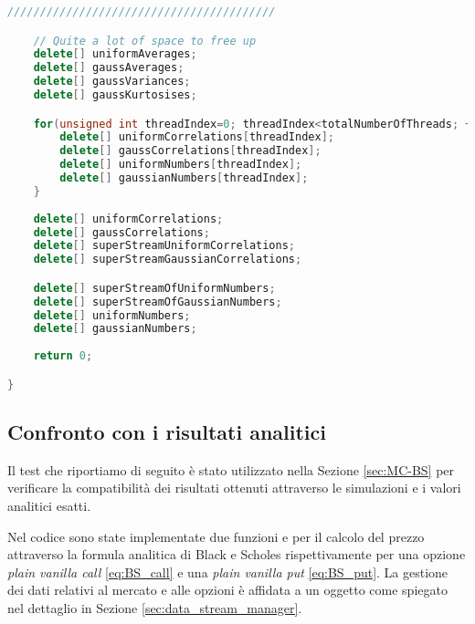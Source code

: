 \begin{lstlisting}[language=C++, caption={\texttt{libraries/CoreLibraries/RandomGenerator/CorrelationTest.cu}}]
/////////////////////////////////////////

	// Quite a lot of space to free up
	delete[] uniformAverages;
	delete[] gaussAverages;
	delete[] gaussVariances;
	delete[] gaussKurtosises;

	for(unsigned int threadIndex=0; threadIndex<totalNumberOfThreads; ++threadIndex){
		delete[] uniformCorrelations[threadIndex];
		delete[] gaussCorrelations[threadIndex];
		delete[] uniformNumbers[threadIndex];
		delete[] gaussianNumbers[threadIndex];
	}
	
	delete[] uniformCorrelations;
	delete[] gaussCorrelations;
	delete[] superStreamUniformCorrelations;
	delete[] superStreamGaussianCorrelations;

	delete[] superStreamOfUniformNumbers;
	delete[] superStreamOfGaussianNumbers;
	delete[] uniformNumbers;
	delete[] gaussianNumbers;
	
	return 0;

}
\end{lstlisting}

\subsection{Confronto con i risultati analitici}
Il test che riportiamo di seguito è stato utilizzato nella Sezione \ref{sec:MC-BS} per verificare la compatibilità dei risultati ottenuti attraverso le simulazioni e i valori analitici esatti. 

Nel codice sono state implementate due funzioni  e  per il calcolo del prezzo attraverso la formula analitica di Black e Scholes rispettivamente per una opzione \textit{plain vanilla call} \eqref{eq:BS_call} e una \textit{plain vanilla put} \eqref{eq:BS_put}. La gestione dei dati relativi al mercato e alle opzioni è affidata a un oggetto  come spiegato nel dettaglio in Sezione \ref{sec:data_stream_manager}.

